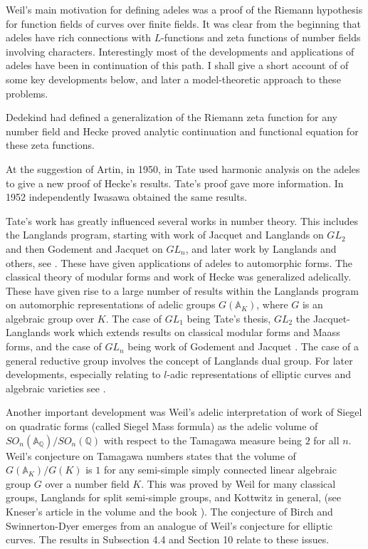 \documentclass[12pt]{amsart}
\def\A{\mathbb{A}}
\def\Q{\mathbb{Q}}
\numberwithin{equation}{section}
\begin{document}
Weil's main motivation for defining adeles was a proof of the Riemann hypothesis for function fields of curves over finite fields. It was clear from the beginning that adeles have rich connections with $L$-functions and zeta functions of number fields involving characters. Interestingly most of the developments and applications of adeles have been in continuation of this path. I shall give a short account of of some key developments below, and later a model-theoretic approach to these problems. 

Dedekind had defined a generalization of the Riemann zeta function for any number field and Hecke proved analytic continuation and functional equation for these zeta functions. 

At the suggestion of Artin, in 1950, in \cite{tate-thesis} Tate used harmonic analysis on the adeles to give a new proof of Hecke's results. Tate's proof gave more information. In 1952 independently Iwasawa obtained the same results. 

Tate's work has greatly influenced several works in number theory. This includes the Langlands program, starting with work of  Jacquet and Langlands \cite{jac-lang} on $GL_2$ and then Godement and Jacquet \cite{jaq-good} on $GL_n$, and later work by Langlands and others, see \cite{lang-prob}. These have given applications of adeles to automorphic forms. The classical theory of modular forms and work of Hecke was generalized adelically. These have given rise to a large number of results within the Langlands program on automorphic representations of adelic groups $G(\A_K)$, where $G$ is an algebraic group over $K$. The case of $GL_1$ being Tate's thesis, $GL_2$ the Jacquet-Langlands work which extends results on classical modular forms and Maass forms, and the case of $GL_n$ being work of Godement and Jacquet \cite{jaq-good}. 
The case of a general reductive group involves the concept of Langlands dual group. For later developments, especially relating to $l$-adic representations of elliptic curves and algebraic varieties see \cite{manin-book}. 

Another important development was 
Weil's adelic interpretation of work of Siegel on quadratic forms (called Siegel Mass formula) as the adelic volume of $SO_{n}(\A_{\Q})/SO_{n}(\Q)$ with respect to the Tamagawa measure being $2$ for all $n$.  
Weil's conjecture on Tamagawa numbers states that the volume of $G(\A_K)/G(K)$ is $1$ for any semi-simple simply connected linear algebraic group $G$ over a number field $K$. This was proved by Weil for many classical groups, Langlands for split semi-simple groups, and Kottwitz in general, (see Kneser's article in the volume \cite{CF} and the book \cite{manin-book}). 
The conjecture of Birch and Swinnerton-Dyer emerges from an analogue of Weil's conjecture for elliptic curves. The results in Subsection 4.4 and Section 10 relate to these issues. 
\end{document}
